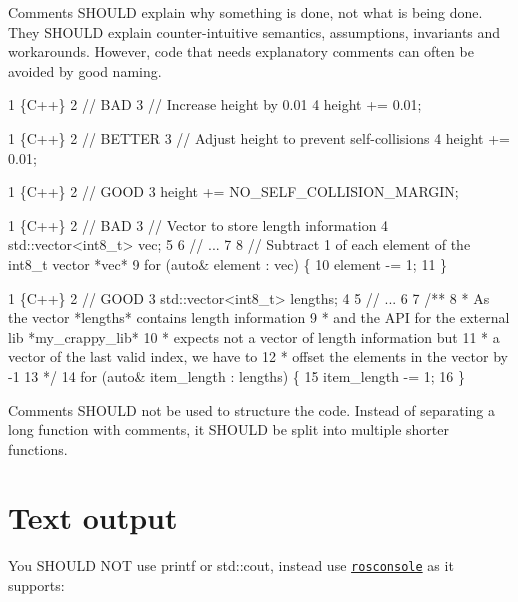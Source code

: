 Comments S\+H\+O\+U\+LD explain why something is done, not what is being done. They S\+H\+O\+U\+LD explain counter-\/intuitive semantics, assumptions, invariants and workarounds. However, code that needs explanatory comments can often be avoided by good naming.


\begin{DoxyCode}
1 \{C++\}
2 // BAD
3 // Increase height by 0.01
4 height += 0.01;
\end{DoxyCode}



\begin{DoxyCode}
1 \{C++\}
2 // BETTER
3 // Adjust height to prevent self-collisions
4 height += 0.01;
\end{DoxyCode}



\begin{DoxyCode}
1 \{C++\}
2 // GOOD
3 height += NO\_SELF\_COLLISION\_MARGIN;
\end{DoxyCode}



\begin{DoxyCode}
1 \{C++\}
2 // BAD
3 // Vector to store length information
4 std::vector<int8\_t> vec;
5 
6 // ...
7 
8 // Subtract 1 of each element of the int8\_t vector *vec*
9 for (auto& element : vec) \{
10     element -= 1;
11 \}
\end{DoxyCode}



\begin{DoxyCode}
1 \{C++\}
2 // GOOD
3 std::vector<int8\_t> lengths;
4 
5 // ...
6 
7 /**
8  *   As the vector *lengths* contains length information
9  *   and the API for the external lib *my\_crappy\_lib*
10  *   expects not a vector of length information but
11  *   a vector of the last valid index, we have to 
12  *   offset the elements in the vector by -1
13  */
14 for (auto& item\_length : lengths) \{
15     item\_length -= 1;
16 \}
\end{DoxyCode}


Comments S\+H\+O\+U\+LD not be used to structure the code. Instead of separating a long function with comments, it S\+H\+O\+U\+LD be split into multiple shorter functions.

\section*{Text output}

You S\+H\+O\+U\+LD N\+OT use {\ttfamily printf} or {\ttfamily std\+::cout}, instead use \href{http://wiki.ros.org/rosconsole}{\tt rosconsole} as it supports\+:


